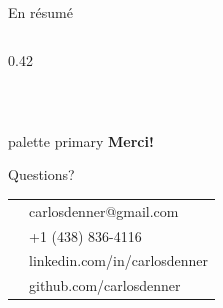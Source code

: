 \documentclass[aspectratio=169,11pt]{beamer}
\begin{document}
\begin{frame}{En résumé}
\begin{columns}[T]
\begin{column}{0.42\textwidth}
      \vspace{0.5em}
      
      \begin{center}
        \\
      \end{center}
    \end{column}
  \end{columns}
\end{frame}

\begin{frame}{}
  \begin{beamercolorbox}[wd=\paperwidth,ht=2.5cm,dp=0.5cm,center]{palette primary}
    {\Large\bfseries Merci!}
  \end{beamercolorbox}
  
  \vspace{1.5cm}
  
  \begin{center}
    {\Large Questions?}
  \end{center}
  
  \vspace{1em}
  
  \begin{tabular}{cl}
    & carlosdenner@gmail.com \\
    & +1 (438) 836-4116 \\
    & linkedin.com/in/carlosdenner \\
    & github.com/carlosdenner \\
  \end{tabular}
\end{frame}
\end{document}
